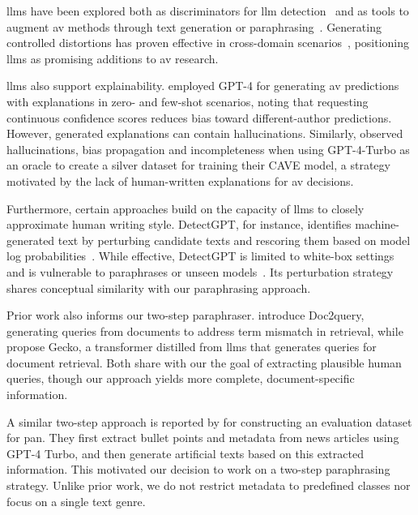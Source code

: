\acp{llm} have been explored both as discriminators for \ac{llm} detection~\citep{futrzynski_pairwise_2021} and as tools to augment \ac{av} methods through text generation or paraphrasing~\citep{mao_raidar_2024,baradia_mirror_2025}. 
Generating controlled distortions has proven effective in cross-domain scenarios~\citep{bischoff_importance_2020}, positioning \acp{llm} as promising additions to \ac{av} research.

\acp{llm} also support explainability. 
\citet{hung_xai_av_llm_2023} employed GPT-4 for generating \ac{av} predictions with explanations in zero- and few-shot scenarios, noting that requesting continuous confidence scores reduces bias toward different-author predictions. 
However, generated explanations can contain hallucinations. 
Similarly, \citet{ramnath_cave_xai_llm_2025} observed hallucinations, bias propagation and incompleteness when using GPT-4-Turbo as an oracle to create a silver dataset for training their CAVE model, a strategy motivated by the lack of human-written explanations for \ac{av} decisions.

Furthermore, certain approaches build on the capacity of \acp{llm} to closely approximate human writing style.
DetectGPT, for instance, identifies machine-generated text by perturbing candidate texts and rescoring them based on model log probabilities~\citep{mitchell_detectgpt_2023}. 
While effective, DetectGPT is limited to white-box settings and is vulnerable to paraphrases or unseen models~\citep{Wu_ODD_challenges_2025}. 
Its perturbation strategy shares conceptual similarity with our paraphrasing approach.

Prior work also informs our two-step paraphraser. 
\citet{nogueira_doc2query_2019} introduce Doc2query, generating queries from documents to address term mismatch in retrieval, while \citet{lee_gecko_2024} propose Gecko, a transformer distilled from \acp{llm} that generates queries for document retrieval. 
Both share with our \pextractor{} the goal of extracting plausible human queries, though our approach yields more complete, document-specific information.

A similar two-step approach is reported by \citet{bevendorff_overview_2024} for constructing an evaluation dataset for \acs{pan}.
They first extract bullet points and metadata from news articles using GPT-4 Turbo, and then generate artificial texts based on this extracted information. 
This motivated our decision to work on a two-step paraphrasing strategy. 
Unlike prior work, we do not restrict metadata to predefined classes nor focus on a single text genre.

